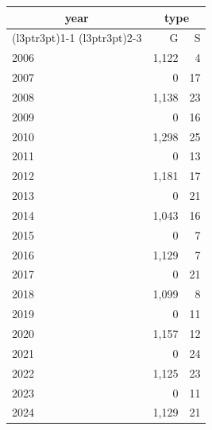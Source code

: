 \footnotesize\begin{tabular}[t]{lrr}
\toprule
\multicolumn{1}{c}{year} & \multicolumn{2}{c}{type} \\
\cmidrule(l{3pt}r{3pt}){1-1} \cmidrule(l{3pt}r{3pt}){2-3}
  & G & S\\
\midrule
2006 & 1,122 & 4\\
2007 & 0 & 17\\
2008 & 1,138 & 23\\
2009 & 0 & 16\\
2010 & 1,298 & 25\\
2011 & 0 & 13\\
2012 & 1,181 & 17\\
2013 & 0 & 21\\
2014 & 1,043 & 16\\
2015 & 0 & 7\\
2016 & 1,129 & 7\\
2017 & 0 & 21\\
2018 & 1,099 & 8\\
2019 & 0 & 11\\
2020 & 1,157 & 12\\
2021 & 0 & 24\\
2022 & 1,125 & 23\\
2023 & 0 & 11\\
2024 & 1,129 & 21\\
\bottomrule
\end{tabular}
